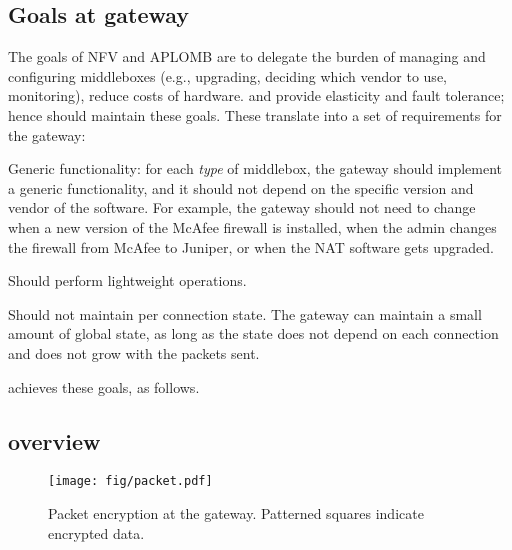 \subsection{Goals at gateway}

The goals of NFV and APLOMB are to delegate the burden of managing and configuring
middleboxes (e.g., upgrading, deciding which vendor to use, monitoring), reduce costs of hardware. 
and provide elasticity and fault tolerance; hence \sys should maintain these goals.
%
These translate into a set of requirements for the gateway:
\begin{CompactItemize}
\item Generic functionality: for each {\em type} of middlebox, the gateway should implement a generic functionality, and it should not depend on the specific version and vendor of the software. For example, the gateway should not need to change when a new version of the McAfee firewall is installed, when the admin changes the firewall  from McAfee to Juniper, or when the NAT software gets upgraded. 
\item Should perform lightweight operations.
\item Should not maintain per connection state. The gateway can maintain a small amount of global state, as long as the state does not depend on each connection and does not grow with the packets sent.  
\end{CompactItemize}


\sys achieves these goals, as follows. 


\subsection{\sys overview}


\begin{figure}[t!]
\centering
  \texttt{[image: fig/packet.pdf]}
\caption{Packet encryption at the gateway. Patterned squares indicate encrypted data. \label{fig:packet}}
\end{figure}





